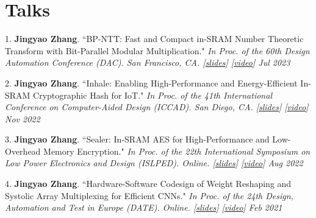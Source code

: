 \documentclass[letterpaper,11pt]{article}
\newcommand{\resumeSubHeadingListStart}{\begin{itemize}[leftmargin=0.15in, label={}]}
\newcommand{\resumeSubHeadingListEnd}{\end{itemize}}
\begin{document}
\section{Talks}
  \vspace{2pt}
  \resumeSubHeadingListStart
    \small{\item{
        1. \textbf{Jingyao Zhang}. ``BP-NTT: Fast and Compact in-SRAM Number Theoretic Transform with Bit-Parallel Modular Multiplication." \textit{In Proc. of the 60th Design Automation Conference (DAC). San Francisco, CA. 
        \emph{[\href{https://jingyao-zhang.github.io/slides/DAC-2023-Slides.pdf}{slides}]
        [\href{https://www.youtube.com/watch?v=iCul63P_v2E}{video}]}
        \hfill Jul 2023} \\ \vspace{3pt}

        
        2. \textbf{Jingyao Zhang}. ``Inhale: Enabling High-Performance and Energy-Efficient In-SRAM Cryptographic Hash for IoT." \textit{In Proc. of the 41th International Conference on Computer-Aided Design (ICCAD). San Diego, CA. 
        \emph{[\href{https://jingyao-zhang.github.io/slides/ICCAD-2022-Slides.pdf}{slides}]
        [\href{https://www.youtube.com/watch?v=e3KeH8AqGks}{video}]}
        \hfill Nov 2022} \\ \vspace{3pt}
        
        3. \textbf{Jingyao Zhang}. ``Sealer: In-SRAM AES for High-Performance and Low-Overhead Memory Encryption." \textit{In Proc. of the 22th International Symposium on Low Power Electronics and Design (ISLPED). Online.
        \emph{[\href{https://jingyao-zhang.github.io/slides/ISLPED-2022-Slides.pdf}{slides}]
        [\href{https://www.youtube.com/watch?v=mBx0Q7_Zk8c}{video}]}
        \hfill Aug 2022} \\ \vspace{3pt}
        
        4. \textbf{Jingyao Zhang}. ``Hardware-Software Codesign of Weight Reshaping and Systolic Array Multiplexing for Efficient CNNs." \textit{In Proc. of the 24th Design, Automation and Test in Europe (DATE). Online.
        \emph{[\href{https://jingyao-zhang.github.io/slides/DATE-2021-Slides.pdf}{slides}]
        [\href{https://www.youtube.com/watch?v=HiyUaztZrys}{video}]}
        \hfill Feb 2021}
    }}
  \resumeSubHeadingListEnd

\end{document}
